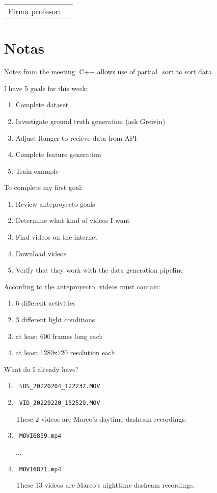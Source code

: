 \documentclass[12pt,oneside]{book}
\begin{document}
  \vfill

  \begin{tabular}{p{3 cm} p{10 cm}}
    Firma profesor: & \\
    \cline{2-2}
  \end{tabular}

  \newpage

  \section{Notas}
  \setlength\parindent{0pt}

  Notes from the meeting:
  C++ allows use of partial\_sort to sort data.

  I have 5 goals for this week:
  \begin{enumerate}
    \item Complete dataset
    \item Investigate ground truth generation (ask Greivin)
    \item Adjust Ranger to recieve data from API
    \item Complete feature generation
    \item Train example
  \end{enumerate}

  To complete my first goal:
  \begin{enumerate}
    \item Review anteproyecto goals
    \item Determine what kind of videos I want
    \item Find videos on the internet
    \item Download videos
    \item Verify that they work with the data generation pipeline
  \end{enumerate}

  According to the anteproyecto, videos must contain:
  \begin{enumerate}
    \item 6 different activities
    \item 3 different light conditions
    \item at least 600 frames long each
    \item at least 1280x720 resolution each
  \end{enumerate}

  What do I already have?
  \begin{enumerate}
    \item \lstinline| SOS_20220204_122232.MOV |
    \item \lstinline| VID_20220220_152529.MOV |
    
    These 2 videos are Marco's daytime dashcam recordings.

    \item \lstinline| MOVI6859.mp4 |
    
    ...

    \item \lstinline| MOVI6871.mp4 |
    
    These 13 videos are Marco's nighttime dashcam recordings.
  \end{enumerate}
\end{document}
